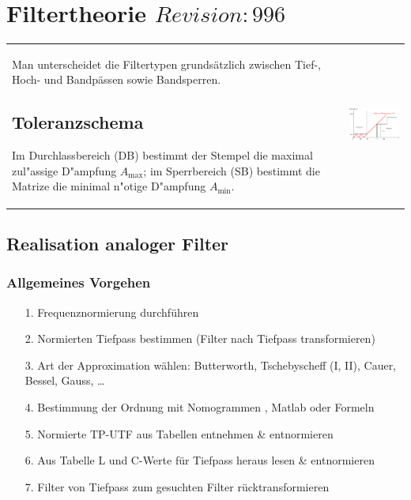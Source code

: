 \section{Filtertheorie  \tiny{$Revision: 996 $}}
\begin{tabular}{ll}
\parbox{12cm}{
	Man unterscheidet die Filtertypen grundsätzlich zwischen
	Tief-, Hoch- und Bandpässen sowie Bandsperren.
	
	\subsection{Toleranzschema }
	Im Durchlassbereich (DB) bestimmt der Stempel die maximal zul"assige D"ampfung
	$A_{\max}$; im Sperrbereich (SB) bestimmt die Matrize die minimal n"otige
	D"ampfung $A_{\min}$.
	}
& \parbox{6cm}{
	\includegraphics[width=6cm]{./images/filter-toleranzschema.png}}
\end{tabular}

\subsection{Realisation analoger Filter}
\subsubsection{Allgemeines Vorgehen}
\begin{itemize}
  \item[1.] Frequenznormierung durchführen
  \item[2.] Normierten Tiefpass bestimmen (Filter nach Tiefpass transformieren)
  \item[3.] Art der Approximation wählen: Butterworth, Tschebyscheff (I, II),
  Cauer, Bessel, Gauss, \ldots
  \item[4.] Bestimmung der Ordnung mit Nomogrammen , Matlab
	 oder Formeln
  \item[5.] Normierte TP-UTF aus Tabellen entnehmen \& entnormieren
  \item[6.] Aus Tabelle  L und C-Werte für Tiefpass heraus lesen
  \& entnormieren
  \item[7.] Filter von Tiefpass zum gesuchten Filter rücktransformieren
\end{itemize}


